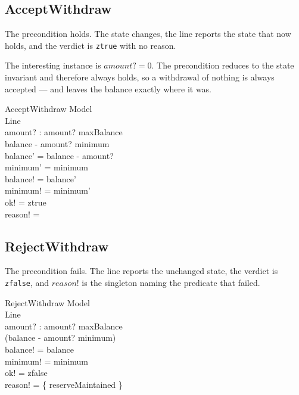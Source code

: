 \documentclass[a4paper,10pt,fleqn]{article}
\begin{document}
\subsection{AcceptWithdraw}

The precondition holds. The state changes, the line reports the state
that now holds, and the verdict is \texttt{ztrue} with no reason.

The interesting instance is $amount? = 0$. The precondition reduces to
the state invariant and therefore always holds, so a withdrawal of
nothing is always accepted --- and leaves the balance exactly where it
was.

\begin{schema}{AcceptWithdraw}
  \Delta Model \\
  Line \\
  amount? : \nat
  \where
  amount? \leq maxBalance \\
  balance - amount? \geq minimum \\
  balance' = balance - amount? \\
  minimum' = minimum \\
  balance! = balance' \\
  minimum! = minimum' \\
  ok! = ztrue \\
  reason! = \emptyset
\end{schema}

\subsection{RejectWithdraw}

The precondition fails. The line reports the unchanged state, the verdict
is \texttt{zfalse}, and $reason!$ is the singleton naming the predicate
that failed.

\begin{schema}{RejectWithdraw}
  \Xi Model \\
  Line \\
  amount? : \nat
  \where
  amount? \leq maxBalance \\
  \lnot (balance - amount? \geq minimum) \\
  balance! = balance \\
  minimum! = minimum \\
  ok! = zfalse \\
  reason! = \{ reserveMaintained \}
\end{schema}
\end{document}
